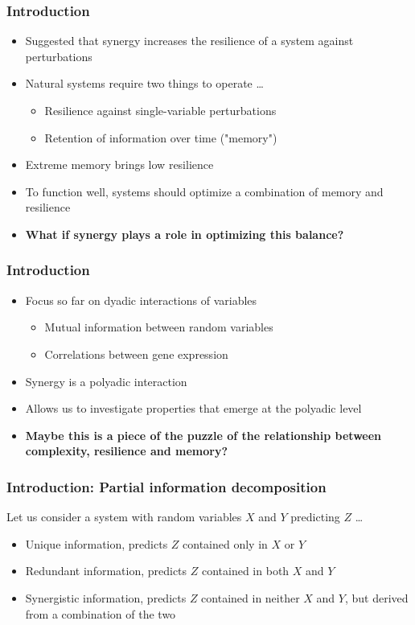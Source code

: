 \documentclass[hyperref={pdfpagelabels=false}]{beamer}
\begin{document}
\begin{frame}
\frametitle{Introduction}
\begin{itemize}
\item Suggested that synergy increases the resilience of a system against perturbations \cite{quax2017quantifying}
\item Natural systems require two things to operate \dots{}
\begin{itemize}
\item Resilience against single-variable perturbations
\item Retention of information over time ("memory")
\end{itemize}
\item Extreme memory brings low resilience
\item To function well, systems should optimize a combination of memory and resilience\\
\item \textbf{What if synergy plays a role in optimizing this balance?}
\end{itemize}
\end{frame}

\begin{frame}
\frametitle{Introduction}
\begin{itemize}
\item Focus so far on dyadic interactions of variables \cite{ideker2001integrated, lu2004gene, tononi1999measures}
\begin{itemize}
\item Mutual information between random variables
\item Correlations between gene expression
\end{itemize}
\item Synergy is a polyadic interaction
\item Allows us to investigate properties that emerge at the polyadic level\\
\item \textbf{Maybe this is a piece of the puzzle of the relationship between complexity, resilience and memory?}
\end{itemize}
\end{frame}

\begin{frame}
\frametitle{Introduction: Partial information decomposition}
Let us consider a system with random variables $X$ and $Y$ predicting $Z$ \dots{}
\begin{itemize}
\item Unique information, predicts $Z$ contained only in $X$ or $Y$
\item Redundant information, predicts $Z$ contained in both $X$ and $Y$
\item Synergistic information, predicts $Z$ contained in neither $X$ and $Y$, but derived from a combination of the two
\end{itemize}
\end{frame}
\end{document}
